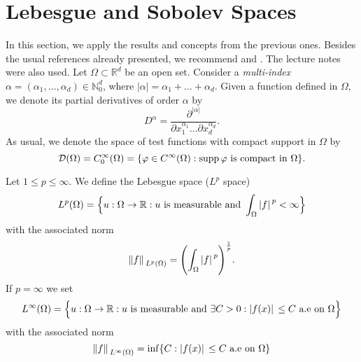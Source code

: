 \section{Lebesgue and Sobolev Spaces}\label{lebesgue_and_sobolev_preliminaries}
In this section, we apply the results and concepts from the previous ones. Besides the usual references already presented, we recommend \cite{lions2012non} and \cite{evans2022partial}. The lecture notes \cite{huguinho} were also used. Let $\Omega \subset \mathbb{R}^d$ be an open set. Consider a \textit{multi-index} $\alpha = (\alpha_1, \dots, \alpha_d) \in \mathbb{N}_0^d$, where $|\alpha| = \alpha_1 + \dots + \alpha_d$. Given a function defined in $\Omega$, we denote its partial derivatives of order $\alpha$ by
\[
D^\alpha = \frac{\partial^{|\alpha|}}{\partial x_1^{\alpha_1}\dots\partial x_d^{\alpha_d}}.   
\]
As usual, we denote the space of test functions with compact support in $\Omega$ by
\[
\mathcal{D}(\Omega) = C_0^\infty(\Omega) = \{\varphi \in C^\infty(\Omega) : \operatorname{supp}\varphi \text{ is compact in }\Omega\}.
\]

\begin{definition}
    Let \(1 \leq p \leq \infty\). We define the Lebesgue space (\(L^p\) space)
    \[
        L^p(\Omega) = \Big\{u: \Omega \rightarrow \mathbb{R}: u \text{ is measurable and } \int_\Omega \abs*{f}^p < \infty\Big\}
    \]
    with the associated norm
    \[
        \norm*{f}_{L^p(\Omega)} = \Biggl(\int_\Omega \abs*{f}^p\Biggr)^{\frac{1}{p}}.
    \]
    If \(p=\infty\) we set
    \[
        L^\infty(\Omega) = \Big\{u: \Omega \rightarrow \mathbb{R}: u \text{ is measurable and } \exists C > 0: \abs*{f(x)} \leq C \text{ a.e on } \Omega \Big\}
    \]
    with the associated norm
    \[
        \norm*{f}_{L^\infty(\Omega)} = \inf \{C: \abs*{f(x)} \leq C \text{ a.e on } \Omega\}
    \]
\end{definition}

